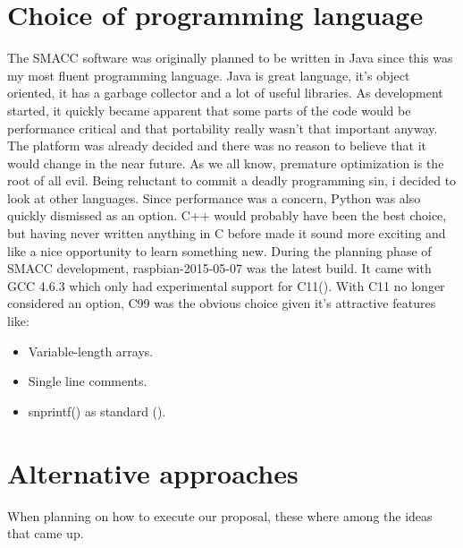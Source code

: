 \documentclass[12pt,english,a4paper]{report}
\begin{document}
\section{Choice of programming language}
The SMACC software was originally planned to be written in Java since this was my most fluent programming language. Java is great language, it's object oriented, it has a garbage collector and a lot of useful libraries. As development started, it quickly became apparent that some parts of the code would be performance critical and that portability really wasn't that important anyway. The platform was already decided and there was no reason to believe that it would change in the near future. As we all know, premature optimization is the root of all evil. Being reluctant to commit a deadly programming sin, i decided to look at other languages. Since performance was a concern, Python was also quickly dismissed as an option. C++ would probably have been the best choice, but having never written anything in C before made it sound more exciting and like a nice opportunity to learn something new. During the planning phase of SMACC development, raspbian-2015-05-07 was the latest build. It came with GCC 4.6.3 which only had experimental support for C11(\cite{GCC11}). With C11 no longer considered an option, C99 was the obvious choice given it's attractive features like:
\begin{itemize}
  \item Variable-length arrays.
  \item Single line comments.
  \item snprintf() as standard (\cite{C_RATIONAL}).
\end{itemize}


\section{Alternative approaches}\label{da}
When planning on how to execute our proposal, these where among the ideas that came up. 
\end{document}
